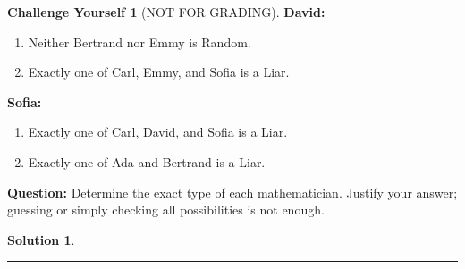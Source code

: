 \documentclass{article}
\theoremstyle{definition}
\newtheorem*{challenge}{Challenge Yourself}
\def\fline{\rule{0.75\linewidth}{0.5pt}}
\newcommand{\finishline}{\begin{center}\fline\end{center}}
\newtheorem*{solution*}{Solution}
\newenvironment{solution}{\begin{solution*}}{{\finishline} \end{solution*}}
\begin{document}
\begin{challenge} [NOT FOR GRADING]
\textbf{David:}
\begin{enumerate}
    \item Neither Bertrand nor Emmy is Random.
    \item Exactly one of Carl, Emmy, and Sofia is a Liar.
\end{enumerate}

\textbf{Sofia:}
\begin{enumerate}
    \item Exactly one of Carl, David, and Sofia is a Liar.
    \item Exactly one of Ada and Bertrand is a Liar.
\end{enumerate}

\medskip

\textbf{Question:} Determine the exact type of each mathematician.
Justify your answer; guessing or simply checking all possibilities is not enough.

\begin{solution}



\end{solution}

\end{challenge}
\end{document}
